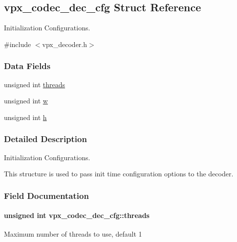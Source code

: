 \hypertarget{structvpx__codec__dec__cfg}{}\subsection{vpx\+\_\+codec\+\_\+dec\+\_\+cfg Struct Reference}
\label{structvpx__codec__dec__cfg}


Initialization Configurations.  




{\ttfamily \#include $<$vpx\+\_\+decoder.\+h$>$}

\subsubsection*{Data Fields}
\begin{DoxyCompactItemize}
\item 
unsigned int \hyperlink{structvpx__codec__dec__cfg_afca69d81e99ee15e1d641a639aefb7eb}{threads}
\item 
unsigned int \hyperlink{structvpx__codec__dec__cfg_acf188f8a7e6c8e1d1a7f488a76f9da42}{w}
\item 
unsigned int \hyperlink{structvpx__codec__dec__cfg_a45311c284e8371d58eb403437db5f2f9}{h}
\end{DoxyCompactItemize}


\subsubsection{Detailed Description}
Initialization Configurations. 

This structure is used to pass init time configuration options to the decoder. 

\subsubsection{Field Documentation}
\paragraph[{\texorpdfstring{threads}{threads}}]{\setlength{\rightskip}{0pt plus 5cm}unsigned int vpx\+\_\+codec\+\_\+dec\+\_\+cfg\+::threads}\hypertarget{structvpx__codec__dec__cfg_afca69d81e99ee15e1d641a639aefb7eb}{}\label{structvpx__codec__dec__cfg_afca69d81e99ee15e1d641a639aefb7eb}
Maximum number of threads to use, default 1 
